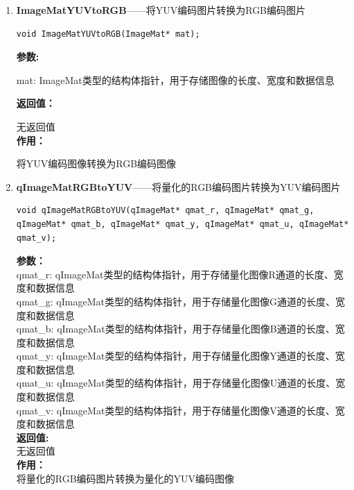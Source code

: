 \documentclass[12pt, a4paper, oneside]{ctexbook}
\begin{document}
\begin{enumerate}
			\item \textbf{ImageMatYUVtoRGB}——将YUV编码图片转换为RGB编码图片
				\begin{lstlisting}[numbers=none]
void ImageMatYUVtoRGB(ImageMat* mat);
				\end{lstlisting}
				\textbf{参数:} \par mat: ImageMat类型的结构体指针，用于存储图像的长度、宽度和数据信息\par 
				\textbf{返回值：}\par 无返回值 \\
				\textbf{作用：}\par  将YUV编码图像转换为RGB编码图像\\
			\item \textbf{qImageMatRGBtoYUV}——将量化的RGB编码图片转换为YUV编码图片
				\begin{lstlisting}[numbers=none]
void qImageMatRGBtoYUV(qImageMat* qmat_r, qImageMat* qmat_g, qImageMat* qmat_b, qImageMat* qmat_y, qImageMat* qmat_u, qImageMat* qmat_v);
				\end{lstlisting}
				\textbf{参数：} \\
					qmat\_r: qImageMat类型的结构体指针，用于存储量化图像R通道的长度、宽度和数据信息 \\ 
					qmat\_g: qImageMat类型的结构体指针，用于存储量化图像G通道的长度、宽度和数据信息 \\ 
					qmat\_b: qImageMat类型的结构体指针，用于存储量化图像B通道的长度、宽度和数据信息 \\ 
					qmat\_y: qImageMat类型的结构体指针，用于存储量化图像Y通道的长度、宽度和数据信息 \\ 
					qmat\_u: qImageMat类型的结构体指针，用于存储量化图像U通道的长度、宽度和数据信息 \\
					qmat\_v: qImageMat类型的结构体指针，用于存储量化图像V通道的长度、宽度和数据信息 \\
				\textbf{返回值:} \\ 无返回值 \\
				\textbf{作用：} \\ 将量化的RGB编码图片转换为量化的YUV编码图像
				

\end{enumerate}
\end{document}
